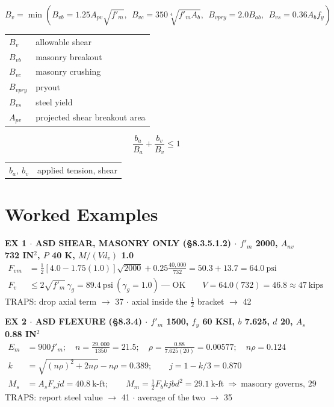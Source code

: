 \documentclass[10pt]{article}
\begin{document}
\begin{equation}
B_v = \min\left( B_{vb} = 1.25 A_{pv}\sqrt{f'_m},\ \ B_{vc} = 350\sqrt[4]{f'_m A_b},\ \ B_{vpry} = 2.0 B_{ab},\ \ B_{vs} = 0.36 A_b f_y \right)
\end{equation}
{\ttfamily\footnotesize \begin{tabular}{@{}ll@{}}
$B_v$ & allowable shear\\
$B_{vb}$ & masonry breakout\\
$B_{vc}$ & masonry crushing\\
$B_{vpry}$ & pryout\\
$B_{vs}$ & steel yield\\
$A_{pv}$ & projected shear breakout area\\
\end{tabular}}

\begin{equation}
\frac{b_a}{B_a} + \frac{b_v}{B_v} \le 1
\end{equation}
{\ttfamily\footnotesize \begin{tabular}{@{}ll@{}}
$b_a,\ b_v$ & applied tension, shear\\
\end{tabular}}

\section{Worked Examples}

{\ttfamily\footnotesize\bfseries EX 1 $\cdot$ ASD SHEAR, MASONRY ONLY (\S 8.3.5.1.2) $\cdot$ $f'_m$ 2000, $A_{nv}$ 732 IN$^2$, $P$ 40 K, $M/(Vd_v)$ 1.0}
\begin{align*}
F_{vm} &= \tfrac{1}{2}\left[4.0 - 1.75(1.0)\right]\sqrt{2000} + 0.25\tfrac{40{,}000}{732} = 50.3 + 13.7 = 64.0\ \text{psi}\\
F_v &\le 2\sqrt{f'_m}\,\gamma_g = 89.4\ \text{psi}\ (\gamma_g = 1.0) \ \text{— OK} \qquad V = 64.0(732) = 46.8 \approx 47\ \text{kips}
\end{align*}
{\ttfamily\footnotesize TRAPS: drop axial term $\to$ 37 $\cdot$ axial inside the $\frac{1}{2}$ bracket $\to$ 42}

\medskip
{\ttfamily\footnotesize\bfseries EX 2 $\cdot$ ASD FLEXURE (\S 8.3.4) $\cdot$ $f'_m$ 1500, $f_y$ 60 KSI, $b$ 7.625, $d$ 20, $A_s$ 0.88 IN$^2$}
\begin{align*}
E_m &= 900f'_m;\quad n = \tfrac{29{,}000}{1350} = 21.5;\quad \rho = \tfrac{0.88}{7.625(20)} = 0.00577;\quad n\rho = 0.124\\
k &= \sqrt{(n\rho)^2 + 2n\rho} - n\rho = 0.389;\qquad j = 1 - k/3 = 0.870\\
M_s &= A_s F_s j d = 40.8\ \text{k-ft};\qquad M_m = \tfrac{1}{2}F_b k j b d^2 = 29.1\ \text{k-ft} \ \Rightarrow\ \text{masonry governs, } 29
\end{align*}
{\ttfamily\footnotesize TRAPS: report steel value $\to$ 41 $\cdot$ average of the two $\to$ 35}
\end{document}
